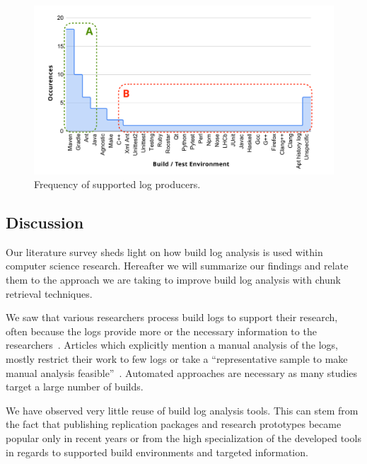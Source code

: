 \begin{figure}[tbhp]
		\centering
		\includegraphics[width=\columnwidth, trim={1.1cm 0.4cm
		1.5cm 0.5cm},
		clip]{img/lit-sur/log_producer_annotated.pdf}
		\caption{Frequency of supported log producers.}
		\label{fig:litsur:log_producer}
\end{figure}

\subsection{Discussion}
\label{sec:lit-sur:discussion}
Our literature survey sheds light on how build log analysis is used within
computer science research.
Hereafter we will summarize our findings and relate them to the
approach we are taking to improve build log analysis with chunk
retrieval techniques.

We saw that various researchers process build logs to support their
research, often because the logs provide more or the necessary information
to the researchers~\cite{ren2018automated}.
Articles which explicitly mention a manual analysis of
the logs, mostly restrict their work to few logs or take a
``representative sample to make manual analysis
feasible''~\cite{zolfagharinia2017not}.
Automated approaches are necessary as many studies target a large
number of builds.

We have observed very little reuse of build log analysis tools.
This can stem from the fact that publishing replication packages and
research prototypes became popular only in recent years or from the
high specialization of the developed tools in regards to supported
build environments and targeted information.

